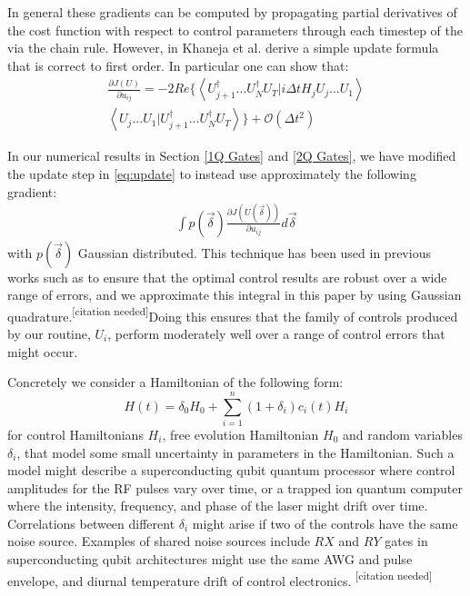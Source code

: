 \documentclass[aps,nofootinbib,pra,notitlepage,twocolumn]{revtex4-1}
\newcommand{\braket}[2]{\left\langle #1 | #2 \right\rangle}
\newcommand{\needcite}{{\color{blue}\textsuperscript{[citation needed]}}}
\begin{document}
In general these gradients can be computed by propagating partial derivatives of the cost function with respect to control parameters through each timestep of the  via the chain rule. However, in \cite{Khaneja2005} Khaneja et al. derive a simple update formula that is correct to first order. In particular one can show that:
\begin{equation}\label{eq:update}
  \begin{split}
\frac{\partial J(U)}{\partial u_{ij}} = -2Re\{\braket{{U_{j+1}^{\dagger}...U_N^{\dagger} U_T}}{i\Delta tH_jU_j...U_1}\\
\braket{U_j...U_1}{U_{j+1}^{\dagger}...U_N^{\dagger} U_T}\} +  \mathcal{O}(\Delta t^2)
  \end{split}
\end{equation}


In our numerical results in Section \ref{1Q Gates} and \ref{2Q Gates}, we have modified the update step in \ref{eq:update} to instead use approximately the following gradient:
\begin{align}\label{quadrature}
\int p(\vec{\delta})\frac{\partial J(U(\vec{\delta}))}{\partial u_{ij}} d\vec{\delta}
\end{align}
with $p(\vec{\delta})$ Gaussian distributed. This technique has been used in previous works such as \cite{Goerz2014} to ensure that the optimal control results are robust over a wide range of errors, and we approximate this integral in this paper by using Gaussian quadrature.\needcite Doing this ensures that the family of controls produced by our routine, $U_i$, perform moderately well over a range of control errors that might occur.

Concretely we consider a Hamiltonian of the following form:
\begin{equation}\label{eq:2}
  H(t) = \delta_0H_0 + \sum_{i=1}^n (1 + \delta_i)c_i(t)H_i
\end{equation}
for control Hamiltonians $H_i$, free evolution Hamiltonian $H_0$ and random variables $\delta_i$, that model some small uncertainty in parameters in the Hamiltonian. Such a model might describe a superconducting qubit quantum processor where control amplitudes for the RF pulses vary over time, or a trapped ion quantum computer where the intensity, frequency, and phase of the laser might drift over time.\cite{Lekitsch2017} Correlations between different $\delta_i$ might arise if two of the controls have the same noise source. Examples of shared noise sources include $RX$ and $RY$ gates in superconducting qubit architectures might use the same AWG and pulse envelope, and diurnal temperature drift of control electronics. \needcite
\end{document}
